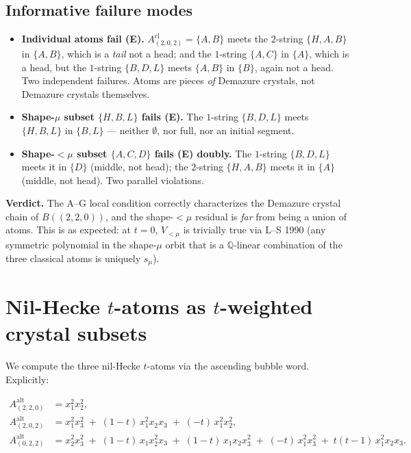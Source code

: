 \documentclass[11pt]{article}
\theoremstyle{definition}
\newcommand{\Aalt}{A^{\mathrm{alt}}}
\begin{document}
\subsection*{Informative failure modes}

\begin{itemize}
\item \textbf{Individual atoms fail (E).} $A^{\mathrm{cl}}_{(2,0,2)}=\{A,B\}$ meets the $2$-string $\{H,A,B\}$ in $\{A,B\}$, which is a \emph{tail} not a head; and the $1$-string $\{A,C\}$ in $\{A\}$, which is a head, but the $1$-string $\{B,D,L\}$ meets $\{A,B\}$ in $\{B\}$, again not a head. Two independent failures. Atoms are pieces \emph{of} Demazure crystals, not Demazure crystals themselves.

\item \textbf{Shape-$\mu$ subset $\{H,B,L\}$ fails (E).} The $1$-string $\{B,D,L\}$ meets $\{H,B,L\}$ in $\{B,L\}$ --- neither $\emptyset$, nor full, nor an initial segment.

\item \textbf{Shape-$<\mu$ subset $\{A,C,D\}$ fails (E) doubly.} The $1$-string $\{B,D,L\}$ meets it in $\{D\}$ (middle, not head); the $2$-string $\{H,A,B\}$ meets it in $\{A\}$ (middle, not head). Two parallel violations.
\end{itemize}

\medskip

\noindent\textbf{Verdict.} The A--G local condition correctly characterizes the Demazure crystal chain of $B((2,2,0))$, and the shape-$<\mu$ residual is \emph{far} from being a union of atoms. This is as expected: at $t=0$, $V_{<\mu}$ is trivially true via L--S 1990 (any symmetric polynomial in the shape-$\mu$ orbit that is a $\mathbb{Q}$-linear combination of the three classical atoms is uniquely $s_\mu$).

\section{Nil-Hecke $t$-atoms as $t$-weighted crystal subsets}

We compute the three nil-Hecke $t$-atoms via the ascending bubble word. Explicitly:

\begin{align*}
\Aalt_{(2,2,0)} &= x_1^2 x_2^2,\\[2pt]
\Aalt_{(2,0,2)} &= x_1^2 x_3^2 \;+\; (1-t)\, x_1^2 x_2 x_3 \;+\; (-t)\, x_1^2 x_2^2,\\[2pt]
\Aalt_{(0,2,2)} &= x_2^2 x_3^2 \;+\; (1-t)\, x_1 x_2^2 x_3 \;+\; (1-t)\, x_1 x_2 x_3^2 \;+\; (-t)\, x_1^2 x_3^2 \;+\; t(t-1)\, x_1^2 x_2 x_3.
\end{align*}
\end{document}
